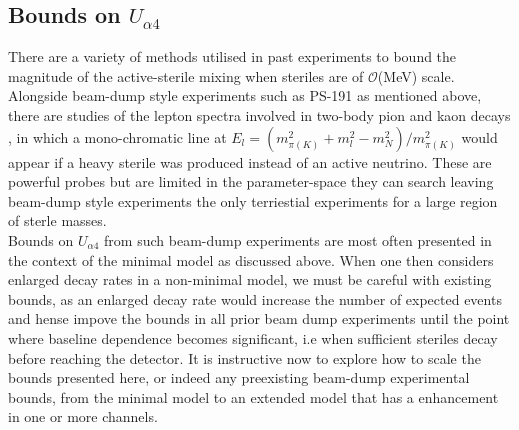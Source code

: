 \documentclass[11pt, a4paper]{article}
\newcommand{\refref}[1]{Ref.~\cite{#1}}
\def\ster{\ensuremath N}
\begin{document}
%
%
\subsection{Bounds on $U_{\alpha 4}$}
There are a variety of methods utilised in past experiments to bound the magnitude of the active-sterile mixing when steriles are of $\mathcal{O}$(MeV) scale. Alongside beam-dump style experiments such as PS-191 as mentioned above, there are studies of the lepton spectra involved in two-body pion and kaon decays\cite{PhysRevD.46.R885,PhysRevLett.68.3000} 
, in which a mono-chromatic line at $E_l = \left( m_{\pi (K)}^2+m_l^2-m_N^2\right)/m_{\pi(K)}^2$ would appear if a heavy sterile was produced instead of an active neutrino. These are powerful probes but are limited in the parameter-space they can search leaving beam-dump style experiments the only terriestial experiments for a large region of sterle masses. \\ 

Bounds on $U_{\alpha 4}$ from such beam-dump experiments are most often presented in the context of the minimal model as discussed above. When one then considers enlarged decay rates in a non-minimal model, we must be careful with existing bounds, as an enlarged decay rate would increase the number of expected events and hense impove the bounds in all prior
beam dump experiments until the point where baseline dependence
becomes significant, i.e when sufficient steriles decay before reaching the detector. It is instructive now to explore how to scale the bounds
presented here, or indeed any preexisting beam-dump experimental bounds, from
the minimal model to an extended model that has a enhancement in one or more
channels.
\end{document}
